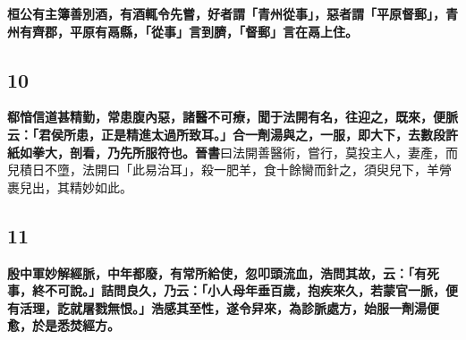 \textbf{桓公有主簿善別酒，有酒輒令先嘗，好者謂「青州從事」，惡者謂「平原督郵」，青州有齊郡，平原有鬲縣，「從事」言到臍，「督郵」言在鬲上住。}

\subsection*{10}

\textbf{郗愔信道甚精勤，常患腹內惡，諸醫不可療，聞于法開有名，往迎之，既來，便脈云：「君侯所患，正是精進太過所致耳。」合一劑湯與之，一服，即大下，去數段許紙如拳大，剖看，乃先所服符也。}{\footnotesize \textbf{晉書}曰法開善醫術，嘗行，莫投主人，妻產，而兒積日不墮，法開曰「此易治耳」，殺一肥羊，食十餘臠而針之，須臾兒下，羊膋裹兒出，其精妙如此。}

\subsection*{11}

\textbf{殷中軍妙解經脈，中年都廢，有常所給使，忽叩頭流血，浩問其故，云：「有死事，終不可說。」詰問良久，乃云：「小人母年垂百歲，抱疾來久，若蒙官一脈，便有活理，訖就屠戮無恨。」浩感其至性，遂令舁來，為診脈處方，始服一劑湯便愈，於是悉焚經方。}